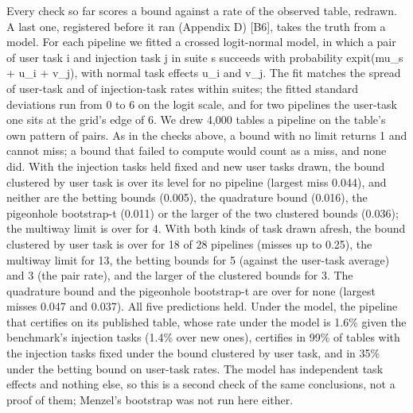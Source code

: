 \documentclass[11pt]{article}
\begin{document}
Every check so far scores a bound against a rate of the observed table, redrawn. A last one, registered before it ran (Appendix D) [B6], takes the truth from a model. For each pipeline we fitted a crossed logit-normal model, in which a pair of user task i and injection task j in suite s succeeds with probability expit(mu\_s + u\_i + v\_j), with normal task effects u\_i and v\_j. The fit matches the spread of user-task and of injection-task rates within suites; the fitted standard deviations run from 0 to 6 on the logit scale, and for two pipelines the user-task one sits at the grid's edge of 6. We drew 4,000 tables a pipeline on the table's own pattern of pairs. As in the checks above, a bound with no limit returns 1 and cannot miss; a bound that failed to compute would count as a miss, and none did. With the injection tasks held fixed and new user tasks drawn, the bound clustered by user task is over its level for no pipeline (largest miss 0.044), and neither are the betting bounds (0.005), the quadrature bound (0.016), the pigeonhole bootstrap-t (0.011) or the larger of the two clustered bounds (0.036); the multiway limit is over for 4. With both kinds of task drawn afresh, the bound clustered by user task is over for 18 of 28 pipelines (misses up to 0.25), the multiway limit for 13, the betting bounds for 5 (against the user-task average) and 3 (the pair rate), and the larger of the clustered bounds for 3. The quadrature bound and the pigeonhole bootstrap-t are over for none (largest misses 0.047 and 0.037). All five predictions held. Under the model, the pipeline that certifies on its published table, whose rate under the model is 1.6\% given the benchmark's injection tasks (1.4\% over new ones), certifies in 99\% of tables with the injection tasks fixed under the bound clustered by user task, and in 35\% under the betting bound on user-task rates. The model has independent task effects and nothing else, so this is a second check of the same conclusions, not a proof of them; Menzel's bootstrap was not run here either.
\end{document}
